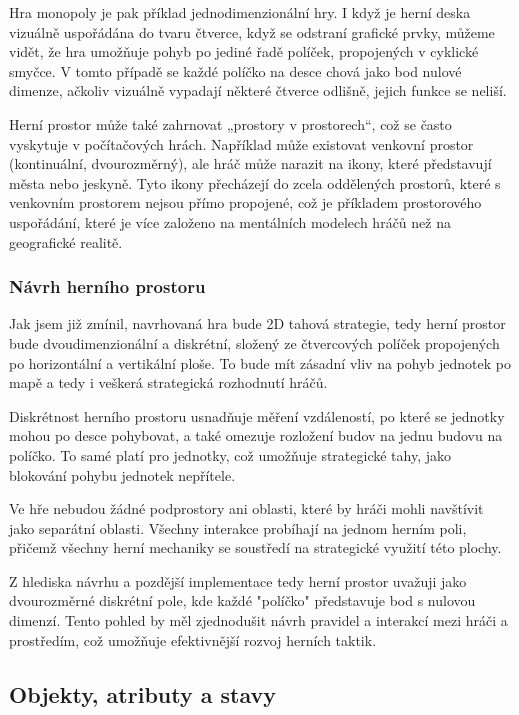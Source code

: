Hra monopoly je pak příklad jednodimenzionální hry. I když je herní deska vizuálně uspořádána do tvaru čtverce, když se odstraní grafické prvky, můžeme vidět, že hra umožňuje pohyb po jediné řadě políček, propojených v cyklické smyčce. V tomto případě se každé políčko na desce chová jako bod nulové dimenze, ačkoliv vizuálně vypadají některé čtverce odlišně, jejich funkce se neliší.

Herní prostor může také zahrnovat „prostory v prostorech“, což se často vyskytuje v počítačových hrách. Například může existovat venkovní prostor (kontinuální, dvourozměrný), ale hráč může narazit na ikony, které představují města nebo jeskyně. Tyto ikony přecházejí do zcela oddělených prostorů, které s venkovním prostorem nejsou přímo propojené, což je příkladem prostorového uspořádání, které je více založeno na mentálních modelech hráčů než na geografické realitě.

\subsubsection{Návrh herního prostoru}

Jak jsem již zmínil, navrhovaná hra bude 2D tahová strategie, tedy herní prostor bude dvoudimenzionální a diskrétní, složený ze čtvercových políček propojených po horizontální a vertikální ploše. To bude mít zásadní vliv na pohyb jednotek po mapě a tedy i veškerá strategická rozhodnutí hráčů.

Diskrétnost herního prostoru usnadňuje měření vzdáleností, po které se jednotky mohou po desce pohybovat, a také omezuje rozložení budov na jednu budovu na políčko. To samé platí pro jednotky, což umožňuje strategické tahy, jako blokování pohybu jednotek nepřítele.

Ve hře nebudou žádné podprostory ani oblasti, které by hráči mohli navštívit jako separátní oblasti. Všechny interakce probíhají na jednom herním poli, přičemž všechny herní mechaniky se soustředí na strategické využití této plochy.

Z hlediska návrhu a pozdější implementace tedy herní prostor uvažuji jako dvourozměrné diskrétní pole, kde každé "políčko" představuje bod s nulovou dimenzí. Tento pohled by měl zjednodušit návrh pravidel a interakcí mezi hráči a prostředím, což umožňuje efektivnější rozvoj herních taktik.

\subsection{Objekty, atributy a stavy}


